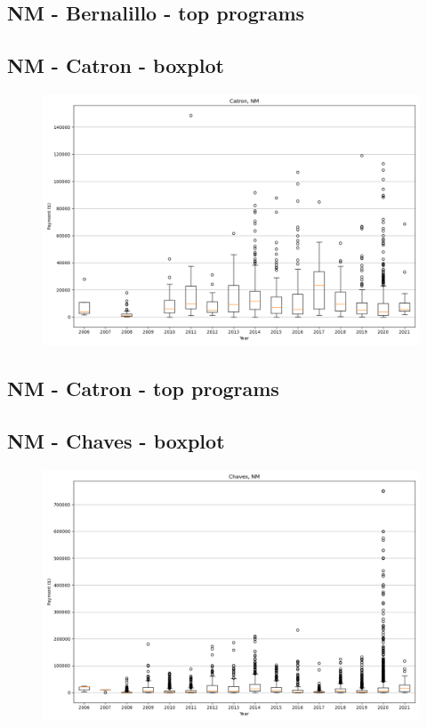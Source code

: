 \subsection*{NM - Bernalillo - top programs}

\newpage
\subsection*{NM - Catron - boxplot}
\begin{figure}[h]
\centering
\includegraphics[width=7in]{../output/boxplots/counties/Catron-NM_boxplot.png}
\end{figure}


\subsection*{NM - Catron - top programs}

\newpage
\subsection*{NM - Chaves - boxplot}
\begin{figure}[h]
\centering
\includegraphics[width=7in]{../output/boxplots/counties/Chaves-NM_boxplot.png}
\end{figure}


